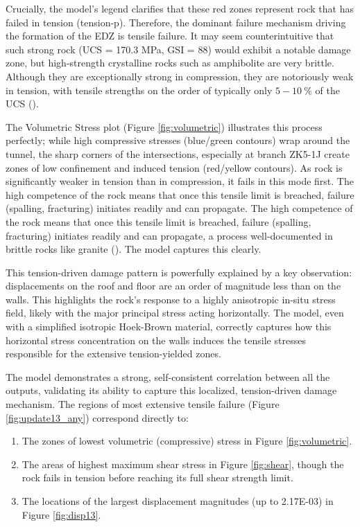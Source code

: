 \par Crucially, the model's legend clarifies that these red zones represent rock that has failed in tension (tension-p). Therefore, the dominant failure mechanism driving the formation of the \gls{EDZ} is tensile failure. It may seem counterintuitive that such strong rock (UCS = 170.3 MPa, GSI = 88) would exhibit a notable damage zone, but high-strength crystalline rocks such as amphibolite are very brittle. Although they are exceptionally strong in compression, they are notoriously weak in tension, with tensile strengths on the order of typically only $5-10~\%$ of the UCS (\cite{Cai2010}).

The Volumetric Stress plot (Figure \ref{fig:volumetric}) illustrates this process perfectly; while high compressive stresses (blue/green contours) wrap around the tunnel, the sharp corners of the intersections, especially at branch ZK5-1J create zones of low confinement and induced tension (red/yellow contours). As rock is significantly weaker in tension than in compression, it fails in this  mode first. The high competence of the rock means that once this tensile limit is breached, failure (spalling, fracturing) initiates readily and can propagate. The high competence of the rock means that once this tensile limit is breached, failure (spalling, fracturing) initiates readily and can propagate, a process well-documented in brittle rocks like granite (\cite{Martin1994,Perras2016}). The model captures this clearly.

\par This tension-driven damage pattern is powerfully explained by a key observation: displacements on the roof and floor are an order of magnitude less than on the walls. This highlights the rock's response to a highly anisotropic in-situ stress field, likely with the major principal stress acting horizontally. The model, even with a simplified isotropic Hoek-Brown material, correctly captures how this horizontal stress concentration on the walls induces the tensile stresses responsible for the extensive tension-yielded zones.

\par The model demonstrates a strong, self-consistent correlation between all the outputs, validating its ability to capture this localized, tension-driven damage mechanism. The regions of most extensive tensile failure (Figure \ref{fig:update13_any}) correspond directly to:
\begin{enumerate}
    

\item The zones of lowest volumetric (compressive) stress in Figure \ref{fig:volumetric}.

\item The areas of highest maximum shear stress in Figure \ref{fig:shear}, though the rock fails in tension before reaching its full shear strength limit.

\item The locations of the largest displacement magnitudes (up to \num{2.17E-03}) in Figure \ref{fig:disp13}.\end{enumerate}

